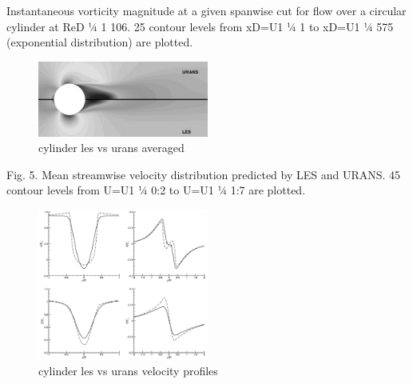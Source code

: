 \documentclass[journal]{new-aiaa}
\begin{document}
Instantaneous vorticity magnitude at a given spanwise cut for flow over a circular cylinder at ReD 1⁄4 1   106. 25 contour levels from xD=U1 1⁄4 1 to xD=U1 1⁄4 575 (exponential distribution) are plotted.


\begin{figure}[H]
\begin{center}
\includegraphics[width=0.5\textwidth]{Images/logan/catalano_2003numerical_SteadyURANSvsLES.pdf}
\caption{ cylinder les vs urans averaged \cite{catalano2003numerical} }
\label{fig:lesvsuranscylinderaveraged}
\end{center}
\end{figure}

Fig. 5. Mean streamwise velocity distribution predicted by LES and URANS. 45 contour levels from U=U1 1⁄4  0:2 to U=U1 1⁄4 1:7 are plotted.

\begin{figure}[H]
\begin{center}
\includegraphics[width=0.5\textwidth]{Images/logan/catalano_2003numerical_VelocityProfiles.pdf}
\caption{ cylinder les vs urans velocity profiles \cite{catalano2003numerical} }
\label{fig:lesvsuranscylindervelprofile}
\end{center}
\end{figure}
\end{document}
